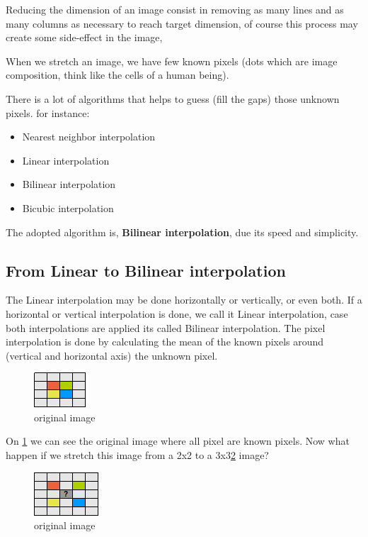 \documentclass{report}
\begin{document}
	Reducing the dimension of an image consist in removing as many lines and as many columns as necessary to reach target dimension, of course this
	process may create some side-effect in the image, 

	When we stretch an image, we have few known pixels (dots which are image composition, think like the cells of a human being).

	There is a lot of algorithms that helps to guess (fill the gaps) those unknown pixels. for instance:

	\begin{itemize}
	  \item Nearest neighbor interpolation
	  \item Linear interpolation
	  \item Bilinear interpolation
	  \item Bicubic interpolation
	\end{itemize}

	The adopted algorithm is, \textbf{Bilinear interpolation},  due its speed and simplicity.
	
\subsection{From Linear to Bilinear interpolation}

	The Linear interpolation may be done horizontally or vertically, or even both. If a horizontal or vertical interpolation is done, we call it
	Linear interpolation, case both interpolations are applied its called Bilinear interpolation.	
	The pixel interpolation is done by calculating the mean of the known pixels around (vertical and horizontal axis) the unknown pixel. 


	\begin{figure} [H]
		\centering
		\includegraphics[scale=1]{images/bilinear_interpolation_1}
		\caption{original image \label{bilinear1}}
	\end{figure}

	On \ref{bilinear1} we can see the original image where all pixel are known pixels. Now what happen if we stretch this image 
	from a 2x2 to a 3x3\ref{bilinear2} image?
	
	\begin{figure} [H]
		\centering
		\includegraphics[scale=1]{images/bilinear_interpolation_2}
		\caption{original image \label{bilinear2}}
	\end{figure}
\end{document}
